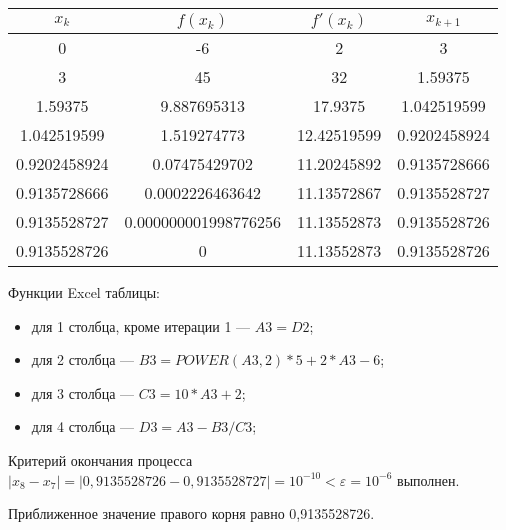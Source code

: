 \documentclass[10pt, a4paper, titlepage]{article}
\begin{document}
\begin{center}
    \begin{tabular}{|c|c|c|c|}
        \hline
        $x_k$ & $f(x_k)$ & $f'(x_k)$ & $x_{k+1}$ \\ \hline
        
        0 & -6 & 2 & 3 \\ \hline
        
        3 &	45 & 32 & 1.59375 \\ \hline
        
        1.59375	& 9.887695313 &	17.9375 & 1.042519599 \\ \hline
        
        1.042519599 & 1.519274773 & 12.42519599 &	0.9202458924 \\ \hline
        
        0.9202458924 &	0.07475429702 &	11.20245892 & 0.9135728666 \\ \hline
        
        0.9135728666 & 0.0002226463642	& 11.13572867 & 0.9135528727 \\ \hline
        
        0.9135528727 & 0.000000001998776256	& 11.13552873	& 0.9135528726 \\ \hline
        
        0.9135528726 &	0 & 11.13552873 & 0.9135528726 \\ \hline
        
    \end{tabular}
\end{center}

Функции Excel таблицы:
\begin{itemize}
    \item для 1 столбца, кроме итерации 1 --- $A3=D2$;
    
    \item для 2 столбца --- $B3=POWER(A3, 2)*5+2*A3-6$;
    
    \item для 3 столбца --- $C3=10*A3+2$;
    
    \item для 4 столбца --- $D3=A3-B3/C3$;

\end{itemize}

Критерий окончания процесса $|x_8-x_7|=|0{,}9135528726-0{,}9135528727|=10^{-10}<\varepsilon=10^{-6}$ выполнен. 

Приближенное значение правого корня равно 0,9135528726.
\end{document}
